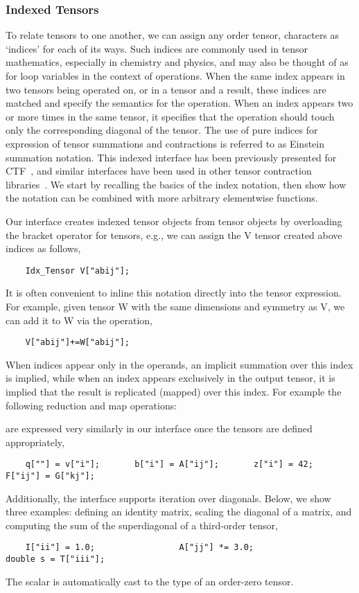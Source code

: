 \subsubsection{Indexed Tensors}

To relate tensors to one another, we can assign any order  tensor,  characters as `indices' for each of its  ways.
Such indices are commonly used in tensor mathematics, especially in chemistry and physics, and may also be thought of as for loop variables in the context of operations.
When the same index appears in two tensors being operated on, or in a tensor and a result, these indices are matched and specify the semantics for the operation.
When an index appears two or more times in the same tensor, it specifies that the operation should touch only the corresponding diagonal of the tensor.
The use of pure indices for expression of tensor summations and contractions is referred to as Einstein summation notation.
This indexed interface has been previously presented for CTF~\cite{solomonik2014massively}, and similar interfaces have been used in other tensor contraction libraries~\cite{JCC:JCC23377}.
We start by recalling the basics of the index notation, then show how the notation can be combined with more arbitrary elementwise functions.

Our interface creates indexed tensor objects from tensor objects by overloading the bracket operator for tensors, e.g., we can assign the {\CD V} tensor created above indices as follows,
\begin{lstlisting}
    Idx_Tensor V["abij"];
\end{lstlisting}
It is often convenient to inline this notation directly into the tensor expression.
For example, given tensor {\CD W} with the same dimensions and symmetry as {\CD V}, we can add it to {\CD W} via the operation,
\begin{lstlisting}
    V["abij"]+=W["abij"];
\end{lstlisting}
When indices appear only in the operands, an implicit summation over this index is implied, while when an index appears exclusively in the output tensor, it is implied that the result is replicated (mapped) over this index.
For example the following reduction and map operations:

are expressed very similarly in our interface once the tensors are defined appropriately,
\begin{lstlisting}
    q[""] = v["i"];       b["i"] = A["ij"];       z["i"] = 42;       F["ij"] = G["kj"];
\end{lstlisting}
Additionally, the interface supports iteration over diagonals.
Below, we show three examples: defining an identity matrix, scaling the diagonal of a matrix, and computing the sum of the superdiagonal of a third-order tensor,
\begin{lstlisting}
    I["ii"] = 1.0;                 A["jj"] *= 3.0;                 double s = T["iii"];
\end{lstlisting}
The scalar  is automatically cast to the type of an order-zero tensor.

